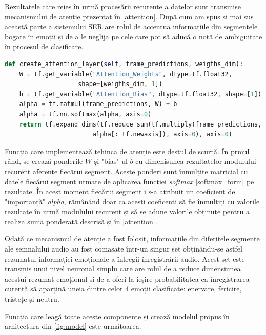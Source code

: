 \documentclass[a4paper,12pt]{book}
\begin{document}
		Rezultatele care reies în urmă procesării recurente a datelor sunt transmise mecanismului de atenție prezentat în \ref{attention}. După cum am spus și mai sus această parte a sistemului SER are rolul de accentua informațiile din segmentele bogate în emoții și de a le neglija pe cele care pot să aducă o notă de ambiguitate în procesul de clasificare. \par
		
		\begin{lstlisting}[language=Python, caption={Metoda care implementeaza mecanismul de atentie, \ref{attention}.}]	
def create_attention_layer(self, frame_predictions, weigths_dim):
	W = tf.get_variable("Attention_Weights", dtype=tf.float32, 
					shape=[weigths_dim, 1])
	b = tf.get_variable("Attention_Bias", dtype=tf.float32, shape=[1])	
	alpha = tf.matmul(frame_predictions, W) + b
	alpha = tf.nn.softmax(alpha, axis=0)
	return tf.expand_dims(tf.reduce_sum(tf.multiply(frame_predictions, 
						alpha[: tf.newaxis]), axis=0), axis=0)		\end{lstlisting}		
		Funcția care implementează tehinca de atenție este destul de scurtă. În prmul rând, se crează ponderile $W$ și "bias"-ul $b$ cu dimenisunea rezultatelor modulului recurent aferente fiecărui segment. Aceste ponderi sunt înmulțite matricial cu datele fiecărui segment urmate de aplicarea funcției \textit{softmax} \ref{softmax_form} pe rezultate. În acest moment fiecărui segment i s-a atribuit un coeficient de "importanță" \textit{alpha}, rămânând doar ca acești coeficenti să fie înmulțiți cu valorile rezultate în urmă modulului recurent și să se adune valorile obținute pentru a realiza suma ponderată descrisă și în \ref{attention}. \par
		
		Odată ce mecanismul de atenție a fost folosit, informațiile din diferitele segmente ale semnalului audio au fost comasate într-un singur set obținându-se astfel rezumatul informației emoționale a întregii înregistrării audio. Acest set este transmis unui nivel neuronal simplu care are rolul de a reduce dimensiunea acestui rezumat emoțional și de a oferi la ieșire probabilitatea ca înregistrarea curentă să aparțină uneia dintre celor 4 emoții clasificate: enervare, fericire, tristețe și neutru. \par
		
		Funcția care leagă toate aceste componente și crează modelul propus în arhitectura din \ref{fig:model} este următoarea.
		
\end{document}
